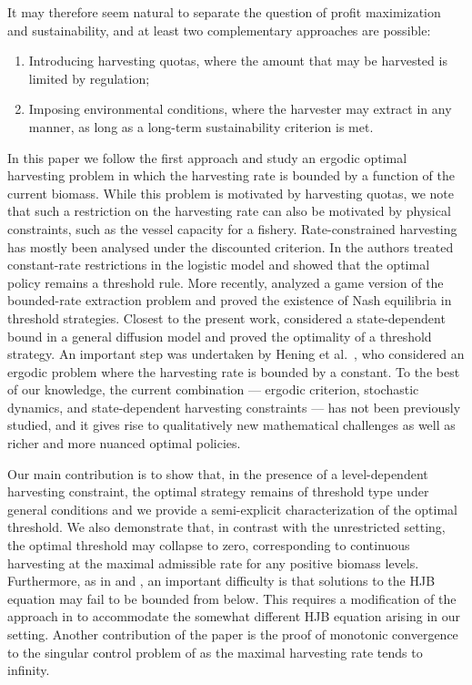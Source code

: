 \documentclass[12pt]{article}
\begin{document}
It may therefore seem natural to separate the question of profit maximization and sustainability, and at least two complementary approaches are possible:
\begin{enumerate}
    \item Introducing harvesting quotas, where the amount that may be harvested is limited by regulation;
    \item Imposing environmental conditions, where the harvester may extract in any manner, as long as a long-term sustainability criterion is met.
\end{enumerate}
In this paper we follow the first approach and study an ergodic optimal harvesting problem in which the harvesting rate is bounded by a function of the current biomass. 
While this problem is motivated by harvesting quotas, we note that such a restriction on the harvesting rate can also be motivated by physical constraints, such as the vessel capacity for a fishery.
Rate-constrained harvesting has mostly been analysed under the discounted criterion. In \citep{Alvarez1998} the authors treated constant-rate restrictions in the logistic model and showed that the optimal policy remains a threshold rule. More recently, \citep{Ekstrom2023} analyzed a game version of the bounded-rate extraction problem and proved the existence of Nash equilibria in threshold strategies. Closest to the present work, \citep{Guerin2024, LocasRenaud2024, RenaudRochSimard2026} considered a state-dependent bound in a general diffusion model and proved the optimality of a threshold strategy.
An important step was undertaken by Hening et al.~\cite{Hening2019}, who considered an ergodic problem where the harvesting rate is bounded by a constant.
To the best of our knowledge, the current combination — ergodic criterion, stochastic dynamics, and state-dependent harvesting constraints — has not been previously studied, and it gives rise to qualitatively new mathematical challenges as well as richer and more nuanced optimal policies.


Our main contribution is to show that, in the presence of a 
level-dependent harvesting constraint, the optimal strategy remains of threshold type under general conditions and we provide a semi-explicit characterization of the optimal threshold. 
We also demonstrate that, in contrast with the unrestricted setting, the optimal threshold may collapse to zero, corresponding to continuous harvesting at the maximal admissible rate for any positive biomass levels.
Furthermore, as in \cite{Cohen2022} and \cite{LiangLiuZervos2025}, an important difficulty is that solutions to the HJB equation may fail to be bounded from below. 
This requires a modification of the approach in \cite{LiangLiuZervos2025} to accommodate the somewhat different HJB equation arising in our setting. Another contribution of the paper is the proof of monotonic convergence to the singular control problem of \citep{AlvarezHening2022} as the maximal harvesting rate tends to infinity.
\end{document}
